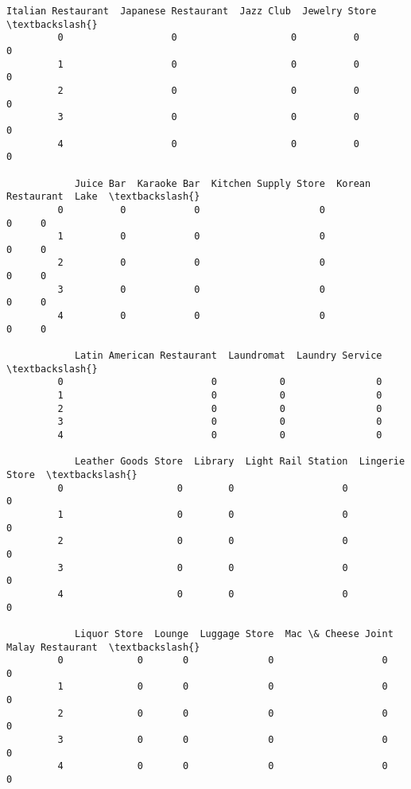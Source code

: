 \documentclass[11pt]{article}
\begin{document}
\begin{Verbatim}[commandchars=\\\{\}]
            Italian Restaurant  Japanese Restaurant  Jazz Club  Jewelry Store  \textbackslash{}
         0                   0                    0          0              0   
         1                   0                    0          0              0   
         2                   0                    0          0              0   
         3                   0                    0          0              0   
         4                   0                    0          0              0   
         
            Juice Bar  Karaoke Bar  Kitchen Supply Store  Korean Restaurant  Lake  \textbackslash{}
         0          0            0                     0                  0     0   
         1          0            0                     0                  0     0   
         2          0            0                     0                  0     0   
         3          0            0                     0                  0     0   
         4          0            0                     0                  0     0   
         
            Latin American Restaurant  Laundromat  Laundry Service  \textbackslash{}
         0                          0           0                0   
         1                          0           0                0   
         2                          0           0                0   
         3                          0           0                0   
         4                          0           0                0   
         
            Leather Goods Store  Library  Light Rail Station  Lingerie Store  \textbackslash{}
         0                    0        0                   0               0   
         1                    0        0                   0               0   
         2                    0        0                   0               0   
         3                    0        0                   0               0   
         4                    0        0                   0               0   
         
            Liquor Store  Lounge  Luggage Store  Mac \& Cheese Joint  Malay Restaurant  \textbackslash{}
         0             0       0              0                   0                 0   
         1             0       0              0                   0                 0   
         2             0       0              0                   0                 0   
         3             0       0              0                   0                 0   
         4             0       0              0                   0                 0   
         

\end{Verbatim}
\end{document}

